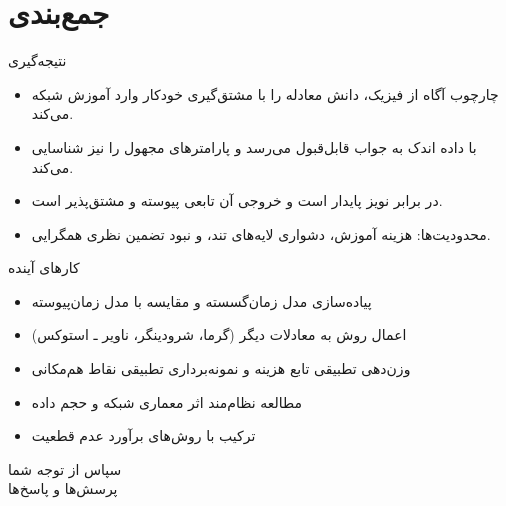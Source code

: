 \documentclass[12pt,aspectratio=169]{beamer}
\begin{document}
\section{جمع‌بندی}

\begin{frame}{نتیجه‌گیری}
\begin{itemize}
\item چارچوب آگاه از فیزیک، دانش معادله را با مشتق‌گیری خودکار وارد آموزش شبکه می‌کند.
\item با داده اندک به جواب قابل‌قبول می‌رسد و پارامترهای مجهول را نیز شناسایی می‌کند.
\item در برابر نویز پایدار است و خروجی آن تابعی پیوسته و مشتق‌پذیر است.
\item محدودیت‌ها: هزینه آموزش، دشواری لایه‌های تند، و نبود تضمین نظری همگرایی.
\end{itemize}
\end{frame}

\begin{frame}{کارهای آینده}
\begin{itemize}
\item پیاده‌سازی مدل زمان‌گسسته و مقایسه با مدل زمان‌پیوسته
\item اعمال روش به معادلات دیگر (گرما، شرودینگر، ناویر ـ استوکس)
\item وزن‌دهی تطبیقی تابع هزینه و نمونه‌برداری تطبیقی نقاط هم‌مکانی
\item مطالعه نظام‌مند اثر معماری شبکه و حجم داده
\item ترکیب با روش‌های برآورد عدم قطعیت
\end{itemize}
\end{frame}

\begin{frame}[plain]
\vspace{15mm}
\begin{center}
{\Large سپاس از توجه شما} \\[6mm]
{\large پرسش‌ها و پاسخ‌ها}
\end{center}
\end{frame}
\end{document}

